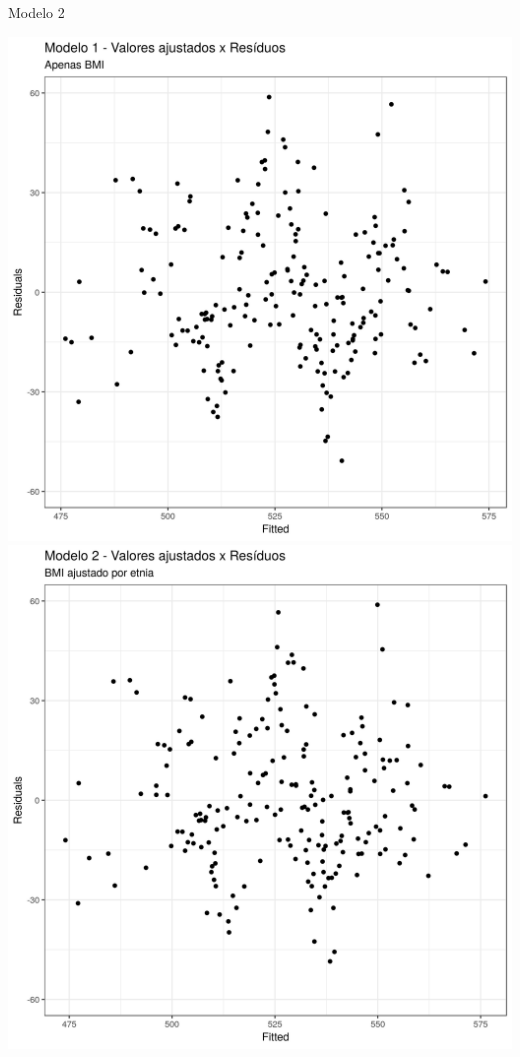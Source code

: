 \documentclass{beamer}
\begin{document}
\begin{frame}{\scriptsize Modelo 2}
  \begin{center}
    \includegraphics[height=.6\textheight]{Cap31-32/pratica-rlm1-resid}
    \includegraphics[height=.6\textheight]{Cap31-32/pratica-rlm2_0-resid}
  \end{center}
\end{frame}
\end{document}
